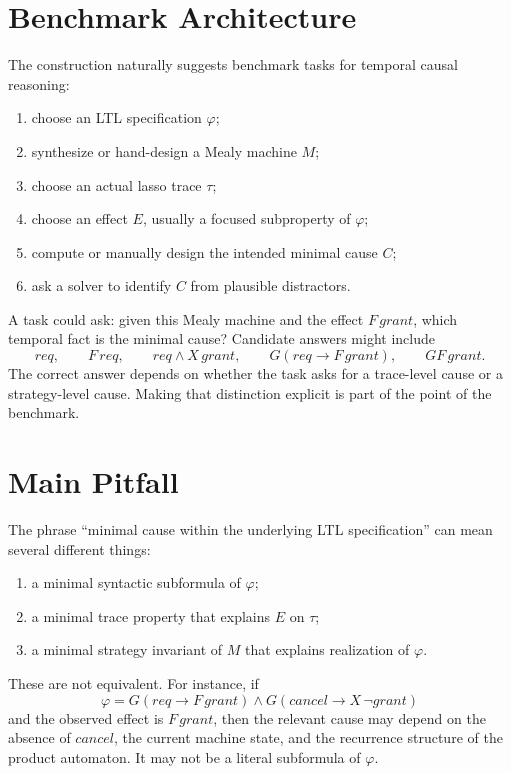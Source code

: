\documentclass[11pt]{article}
\theoremstyle{remark}
\begin{document}
\section{Benchmark Architecture}

The construction naturally suggests benchmark tasks for temporal causal
reasoning:
\begin{enumerate}[label=\arabic*.]
  \item choose an LTL specification \(\varphi\);
  \item synthesize or hand-design a Mealy machine \(M\);
  \item choose an actual lasso trace \(\tau\);
  \item choose an effect \(E\), usually a focused subproperty of \(\varphi\);
  \item compute or manually design the intended minimal cause \(C\);
  \item ask a solver to identify \(C\) from plausible distractors.
\end{enumerate}

A task could ask: given this Mealy machine and the effect \(F\,grant\), which
temporal fact is the minimal cause? Candidate answers might include
\[
  req,\qquad
  F\,req,\qquad
  req\land X\,grant,\qquad
  G(req\rightarrow F\,grant),\qquad
  GF\,grant .
\]
The correct answer depends on whether the task asks for a trace-level cause or
a strategy-level cause. Making that distinction explicit is part of the point
of the benchmark.

\section{Main Pitfall}

The phrase ``minimal cause within the underlying LTL specification'' can
mean several different things:
\begin{enumerate}[label=\arabic*.]
  \item a minimal syntactic subformula of \(\varphi\);
  \item a minimal trace property that explains \(E\) on \(\tau\);
  \item a minimal strategy invariant of \(M\) that explains realization of
        \(\varphi\).
\end{enumerate}
These are not equivalent. For instance, if
\[
  \varphi =
  G(req\rightarrow F\,grant)
  \land
  G(cancel\rightarrow X\,\neg grant)
\]
and the observed effect is \(F\,grant\), then the relevant cause may depend on
the absence of \(cancel\), the current machine state, and the recurrence
structure of the product automaton. It may not be a literal subformula of
\(\varphi\).
\end{document}
